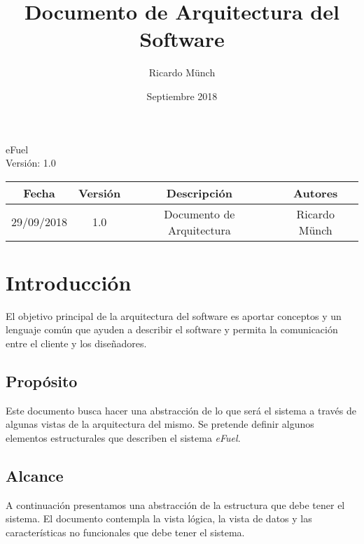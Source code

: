 \documentclass{article}
\title{Documento de Arquitectura del Software} \let\Title\@title
\date{Septiembre 2018} \let\Date\@date
\author{Ricardo Münch} \let\Author\@author
\begin{document}
    \begin{titlepage}
        \huge{\Title}
        \begin{flushright}
            \Large{eFuel \\ Versión: 1.0}
        \end{flushright}
    \end{titlepage}

    \restoregeometry

    \newpage
    \tableofcontents

    \newpage
    \listoffigures

    \newpage
    \begin{center}
        \begin{tabular}{ |c|c|c|c| }
            \hline
            \rowcolor{gray!30}
            Fecha & Versión & Descripción & Autores \\ [0.5ex]
            \hline\hline
            29/09/2018 & 1.0 & Documento de Arquitectura & Ricardo Münch \\
            \hline
        \end{tabular}
    \end{center}

    \newpage
    \section{Introducción}
    El objetivo principal de la arquitectura del software es aportar conceptos y un lenguaje común que ayuden a describir el software y permita la comunicación entre el cliente y los diseñadores.

    \subsection{Propósito}
    Este documento busca hacer una abstracción de lo que será el sistema a través de algunas vistas de la arquitectura del mismo. Se pretende definir algunos elementos estructurales que describen el sistema \emph{eFuel}.

    \subsection{Alcance}
    A continuación presentamos una abstracción de la estructura que debe tener el sistema. El documento contempla la vista lógica, la vista de datos y las características no funcionales que debe tener el sistema.
\end{document}
